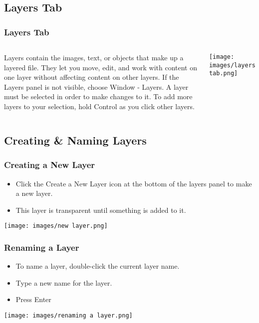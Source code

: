 \documentclass{beamer}
\begin{document}
		\subsection{Layers Tab}		
				\begin{frame}
			\frametitle{Layers Tab}
	\begin{columns}
	\vspace{-15pt}
	\begin{outline}
		\1 Layers contain the images, text, or objects that make up a layered file. 
		\2 They let you move, edit, and work with content on one layer without affecting content on other layers.
		\1 If the Layers panel is not visible, choose Window - Layers.
		\1 A layer must be selected in order to make changes to it.  
		\1 To add more layers to your selection, hold Control as you click other layers.
	\end{outline}
	\texttt{[image: images/layers tab.png]}
\end{columns}
		\end{frame}
	
	\subsection{Creating \& Naming Layers}		
\begin{frame}
	\frametitle{Creating a New Layer}
	\begin{itemize}
		\item Click the Create a New Layer icon at the bottom of the layers panel to make a new layer. 
		\item This layer is transparent until something is added to it.
	\end{itemize}
	\begin{center}
		\texttt{[image: images/new layer.png]}
	\end{center}
\end{frame}

\begin{frame}
	\frametitle{Renaming a Layer}
	\begin{itemize}
		\item To name a layer, double-click the current layer name. 
		\item Type a new name for the layer. 
		\item Press Enter
	\end{itemize}
	\begin{center}
		\texttt{[image: images/renaming a layer.png]}
	\end{center}
\end{frame}
	
\end{document}
